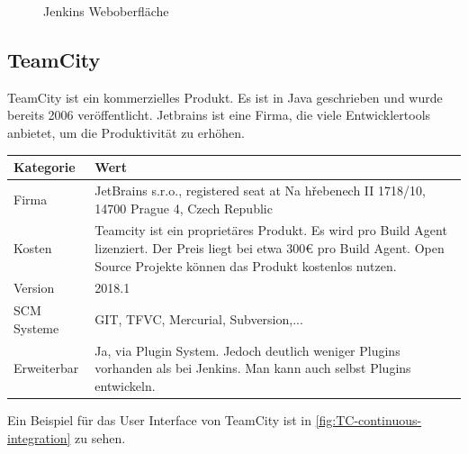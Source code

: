 \begin{figure}[H]
  \centering
  \caption{Jenkins Weboberfläche \cite{Jenkins-Example}}\label{fig:Jenkins-sample}
\end{figure}
\subsection{TeamCity}
TeamCity ist ein kommerzielles Produkt. Es ist in Java geschrieben und wurde bereits 2006 veröffentlicht. Jetbrains ist eine Firma, die viele Entwicklertools anbietet, um die Produktivität zu erhöhen. 
\begin{center}
  \begin{tabularx}{\textwidth}{lX}
    \toprule
    Kategorie & Wert \\
    \midrule
    Firma &  JetBrains s.r.o., registered seat at Na hřebenech II 1718/10, 14700 Prague 4, Czech Republic \\
		\addlinespace
    Kosten & Teamcity ist ein proprietäres Produkt. Es wird pro Build Agent lizenziert. Der Preis liegt bei etwa 300€ pro Build Agent. Open Source Projekte können das Produkt kostenlos nutzen.\\
		\addlinespace
		Version & 2018.1 \\
		\addlinespace
		SCM Systeme & GIT, TFVC, Mercurial, Subversion,...\\
		\addlinespace
		Erweiterbar & Ja, via Plugin System. Jedoch deutlich weniger Plugins vorhanden als bei Jenkins. Man kann auch selbst Plugins entwickeln.\\
    \bottomrule
  \end{tabularx}
\end{center}
Ein Beispiel für das User Interface von TeamCity ist in \autoref{fig:TC-continuous-integration} zu sehen. 

